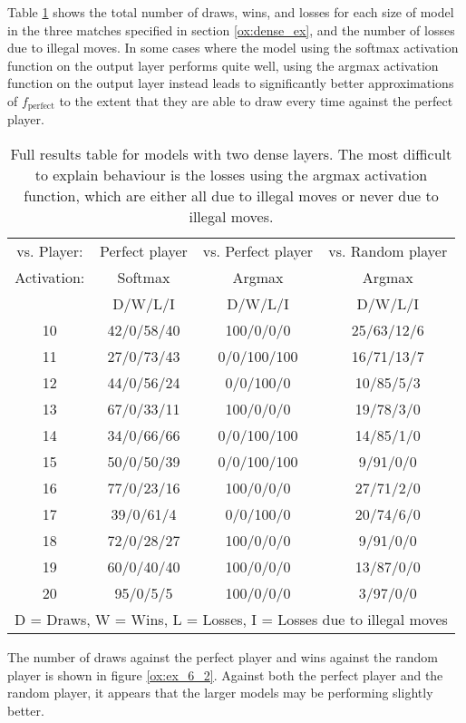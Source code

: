 \documentclass{somasmsc}
\begin{document}
\begin{exa}
Table \ref{ox:t1} shows the total number of draws, wins, and losses for each size of model in the three matches specified in section \ref{ox:dense_ex}, and the number of losses due to illegal moves. In some cases where the model using the softmax activation function on the output layer performs quite well, using the argmax activation function on the output layer instead leads to significantly better approximations of $f_{\text{perfect}}$ to the extent that they are able to draw every time against the perfect player.

\begin{table}[h!]
\centering
\begin{tabular}{ |c|c|c|c| }
 \hline
  vs. Player: & Perfect player & vs. Perfect player & vs. Random player \\
  Activation: & Softmax & Argmax & Argmax \\
  & D/W/L/I & D/W/L/I & D/W/L/I \\
 \hline
 10 & 42/0/58/40 & 100/0/0/0   & 25/63/12/6 \\
 11 & 27/0/73/43 & 0/0/100/100 & 16/71/13/7 \\
 12 & 44/0/56/24 & 0/0/100/0   & 10/85/5/3  \\
 13 & 67/0/33/11 & 100/0/0/0   & 19/78/3/0  \\
 14 & 34/0/66/66 & 0/0/100/100 & 14/85/1/0  \\
 15 & 50/0/50/39 & 0/0/100/100 & 9/91/0/0   \\
 16 & 77/0/23/16 & 100/0/0/0   & 27/71/2/0  \\
 17 & 39/0/61/4  & 0/0/100/0   & 20/74/6/0  \\
 18 & 72/0/28/27 & 100/0/0/0   & 9/91/0/0   \\
 19 & 60/0/40/40 & 100/0/0/0   & 13/87/0/0  \\
 20 & 95/0/5/5   & 100/0/0/0   & 3/97/0/0   \\
 \hline
 \multicolumn{4}{|c|}{D = Draws, W = Wins, L = Losses, I = Losses due to illegal moves} \\
 \hline
\end{tabular}
\caption{Full results table for models with two dense layers. The most difficult to explain behaviour is the losses using the argmax activation function, which are either all due to illegal moves or never due to illegal moves.}
\label{ox:t1}
\end{table}

The number of draws against the perfect player and wins against the random player is shown in figure \ref{ox:ex_6_2}. Against both the perfect player and the random player, it appears that the larger models may be performing slightly better.


\end{exa}
\end{document}
